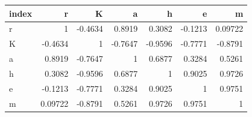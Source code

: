\begin{tabular}{lrrrrrr}
\toprule
index & r & K & a & h & e & m \\
\midrule
r & 1 & -0.4634 & 0.8919 & 0.3082 & -0.1213 & 0.09722 \\
K & -0.4634 & 1 & -0.7647 & -0.9596 & -0.7771 & -0.8791 \\
a & 0.8919 & -0.7647 & 1 & 0.6877 & 0.3284 & 0.5261 \\
h & 0.3082 & -0.9596 & 0.6877 & 1 & 0.9025 & 0.9726 \\
e & -0.1213 & -0.7771 & 0.3284 & 0.9025 & 1 & 0.9751 \\
m & 0.09722 & -0.8791 & 0.5261 & 0.9726 & 0.9751 & 1 \\
\bottomrule
\end{tabular}
